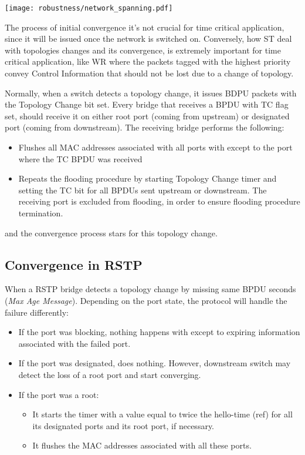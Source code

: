 \begin{center}
        \texttt{[image: robustness/network\_spanning.pdf]}
        \label{fig:free_loops}
\end{center}

The process of initial convergence it's not crucial for time
critical application, since it will be issued once the network is switched on.
Conversely, how ST deal with topologies changes and its
convergence, is extremely important for time critical application, like WR where
the packets tagged with the highest priority convey Control Information that
should not be lost due to a change of topology.

Normally, when a switch detects a topology change, it issues BDPU packets with
the Topology Change bit set. Every bridge that receives a BPDU with TC flag set,
should  receive it on either root port (coming from upstream) or designated port
(coming from downstream). The receiving bridge performs the following:
\begin{itemize}

        \item Flushes all MAC addresses associated with all ports with except to
the port where the TC BPDU was received
        \item Repeats the flooding procedure by starting Topology Change timer
and setting the TC bit for all BPDUs sent upstream or downstream. The receiving
port is excluded from flooding, in order to ensure flooding procedure
termination.
\end{itemize}
and the convergence process stars for this topology change. 

\subsection{Convergence in RSTP}

When a RSTP bridge detects a topology change by missing same BPDU seconds
(\textsl{Max Age Message}). Depending on the port state, the protocol will
handle the failure differently: 

\begin{itemize}

	\item If the port was blocking, nothing happens with except to expiring 
information associated with the failed port.
	\item If the port was designated, does nothing. However, downstream
switch may detect the loss of a root port and start converging. 
	\item If the port was a root: 

	\begin{itemize}
		\item It starts the  timer with a value equal to twice the 
hello-time (ref) for all its designated ports and its root port, if necessary.
		\item It flushes the MAC addresses associated with all these
ports.
	\end{itemize}

\end{itemize}



